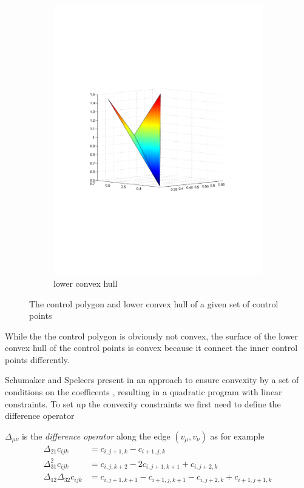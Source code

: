 \begin{figure}[h]
\begin{subfigure}[b]{.5\textwidth}
	\includegraphics[trim=3cm 8cm 3cm 8cm, width=1.\textwidth]{convex_hull2.pdf}
	\caption{lower convex hull}
\end{subfigure}
\caption{The control polygon and lower convex hull of a given set of control points}
\label{fig: diff connectivity}
\end{figure}

While the the control polygon is obviously not convex, the surface of the lower convex hull of the control points is convex because it connect the inner control points differently.

Schumaker and Speleers present in \cite{SS2014} an approach to ensure convexity by a set of conditions on the coefficents , resulting in a quadratic program with linear constraints. To set up the convexity constraints we first need to define the difference operator
\begin{definition}
	$\Delta_{\mu \nu}$ is the \emph{difference operator} along the edge $(v_\mu, v_\nu)$ as for example
	\begin{align*}
		\Delta_{21} c_{ijk} &= c_{i,j+1,k} -c_{i+1, j,k}  \\
		\Delta_{31}^2 c_{ijk} &= c_{i,j,k+2} -2c_{i, j+1,k+1} +c_{i, j+2,k} \\
		\Delta_{12} \Delta_{32} c_{ijk} &= c_{i,j+1,k+1} -c_{i+1, j,k+1} - c_{i,j+2,k} +c_{i+1, j+1,k}\\	\end{align*}
\end{definition}
 
